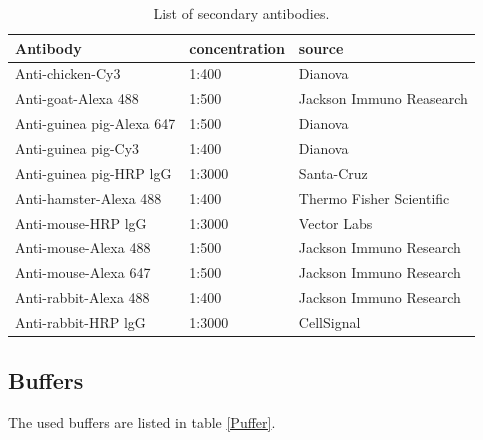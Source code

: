 \documentclass[a4paper,11pt,bibtotocnumbered]{article}
\begin{document}
\begin{table}[H]
\centering
{\captionsetup{format=hang}\caption[List of secondary antibodies]{List of secondary antibodies.}\label{SAntikörper}}
\renewcommand{\arraystretch}{1}
\begin{tabularx}{\textwidth}{Xp{3cm}X}
\toprule
Antibody&concentration&source\\
\midrule
\midrule
Anti-chicken-Cy3&1:400& Dianova\\
\midrule
Anti-goat-Alexa 488&1:500&Jackson Immuno Reasearch\\
\midrule
Anti-guinea pig-Alexa 647&1:500&Dianova\\
\midrule
Anti-guinea pig-Cy3&1:400&Dianova\\
\midrule
Anti-guinea pig-HRP lgG&1:3000&Santa-Cruz\\
\midrule
Anti-hamster-Alexa 488&1:400&Thermo Fisher Scientific\\
\midrule
Anti-mouse-HRP lgG  &1:3000&Vector Labs\\
\midrule
Anti-mouse-Alexa 488&1:500&Jackson Immuno Research\\
\midrule
Anti-mouse-Alexa 647&1:500&Jackson Immuno Research\\
\midrule
Anti-rabbit-Alexa 488&1:400&Jackson Immuno Research\\
\midrule
Anti-rabbit-HRP lgG&1:3000&CellSignal\\
\bottomrule
\end{tabularx}
\end{table}







\subsection{Buffers}

The used buffers are listed in table \ref{Puffer}.
\end{document}
